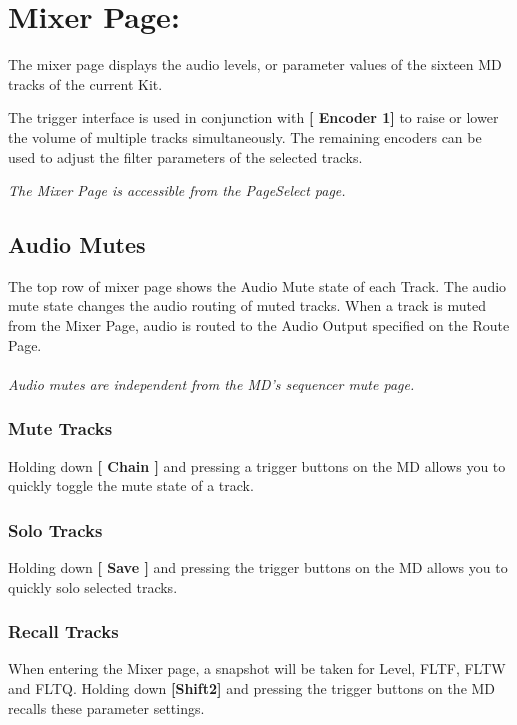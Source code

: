 \chapter{Mixer Page:}
The mixer page displays the audio levels, or parameter values of the sixteen MD tracks of the current Kit.

The trigger interface is used in conjunction with \textbf{[ Encoder 1]} to raise or lower the volume of multiple tracks simultaneously. The remaining encoders can be used to adjust the filter parameters of the selected tracks. 


\textit{The Mixer Page is accessible from the PageSelect page.}


\vspace{-0.4cm}

\section{Audio Mutes}
\vspace{-0.2cm}

The top row of mixer page shows the Audio Mute state of each Track. The audio mute state changes the audio routing of muted tracks. When a track is muted from the Mixer Page, audio is routed to the Audio Output specified on the Route Page.\\
\\
\textit{Audio mutes are independent from the MD's sequencer mute page.}
\subsection{Mute Tracks}Holding down \textbf{[ Chain ]} and pressing a trigger buttons on the MD allows you to quickly toggle the mute state of a track.
\subsection{Solo Tracks}
Holding down \textbf{[ Save ]} and pressing the trigger buttons on the MD allows you to quickly solo selected tracks.
\subsection{Recall Tracks}
When entering the Mixer page, a snapshot will be taken for Level, FLTF, FLTW and FLTQ.
Holding down \textbf{[Shift2]} and pressing the trigger buttons on the MD recalls these parameter settings.
